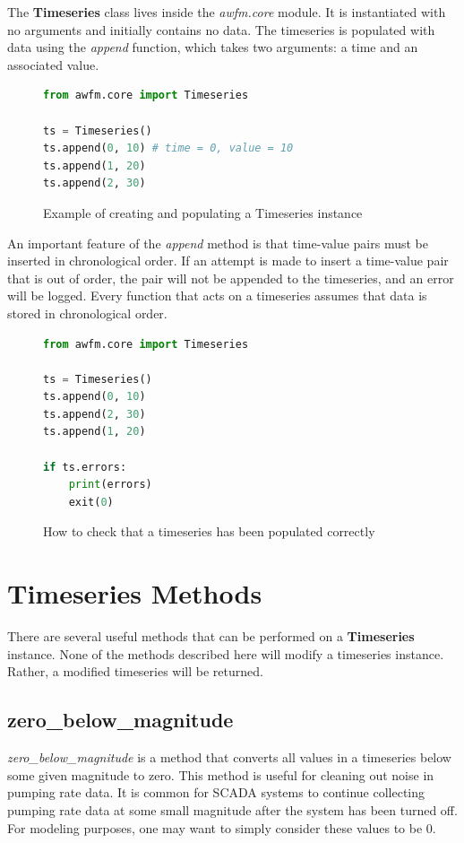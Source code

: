 \documentclass[10pt,twoside,openright]{memoir}
\begin{document}
The \textbf{Timeseries} class lives inside the \emph{awfm.core} module. It is 
instantiated with no arguments and initially contains no data. The timeseries
is populated with data using the \emph{append} function, which takes two arguments: 
a time and an associated value. 

\begin{figure}[!h]
\begin{lstlisting}[language=python]
from awfm.core import Timeseries

ts = Timeseries()
ts.append(0, 10) # time = 0, value = 10
ts.append(1, 20)
ts.append(2, 30)
\end{lstlisting}
\caption{Example of creating and populating a Timeseries instance}
\end{figure}

An important feature of the \emph{append} method is that time-value pairs
must be inserted in chronological order. If an attempt is made to insert a 
time-value pair that is out of order, the pair will not be appended to the
timeseries, and an error will be logged. Every function 
that acts on a timeseries assumes that data is stored in chronological order.

\begin{figure}[!h]
\begin{lstlisting}[language=python]
from awfm.core import Timeseries

ts = Timeseries()
ts.append(0, 10)
ts.append(2, 30)
ts.append(1, 20)

if ts.errors:
    print(errors)
    exit(0)
\end{lstlisting}
\caption{How to check that a timeseries has been populated correctly}
\end{figure}

\section{Timeseries Methods}

There are several useful methods that can be performed on a \textbf{Timeseries}
instance. None of the methods described here will modify a timeseries instance.
Rather, a modified timeseries will be returned. 

\subsection{zero\_below\_magnitude}

\emph{zero\_below\_magnitude} is a method that converts all values in a timeseries
below some given magnitude to zero. This method is useful for cleaning
out noise in pumping rate data. It is common for SCADA systems to continue
collecting pumping rate data at some small magnitude after the system
has been turned off. For modeling purposes, one may want to simply consider
these values to be 0. 
\end{document}
